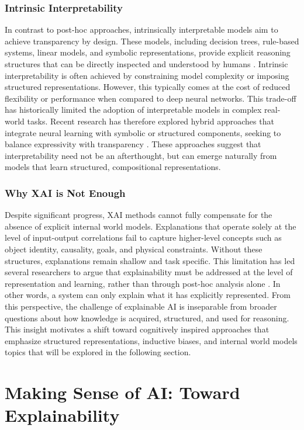 \documentclass[12pt,a4paper]{report}
\begin{document}
\subsubsection{Intrinsic Interpretability}
In contrast to post-hoc approaches, intrinsically interpretable models aim to achieve transparency by design. These models, including decision trees, rule-based systems, linear models, and symbolic representations, provide explicit reasoning structures that can be directly inspected and understood by humans \cite{chiave25}.
Intrinsic interpretability is often achieved by constraining model complexity or imposing structured representations. However, this typically comes at the cost of reduced flexibility or performance when compared to deep neural networks. This trade-off has historically limited the adoption of interpretable models in complex real-world tasks.
Recent research has therefore explored hybrid approaches that integrate neural learning with symbolic or structured components, seeking to balance expressivity with transparency \cite{chiave26}. These approaches suggest that interpretability need not be an afterthought, but can emerge naturally from models that learn structured, compositional representations.

\subsubsection{Why XAI is Not Enough}
Despite significant progress, XAI methods cannot fully compensate for the absence of explicit internal world models. Explanations that operate solely at the level of input-output correlations fail to capture higher-level concepts such as object identity, causality, goals, and physical constraints. Without these structures, explanations remain shallow and task specific.
This limitation has led several researchers to argue that explainability must be addressed at the level of representation and learning, rather than through post-hoc analysis alone \cite{chiave27}. In other words, a system can only explain what it has explicitly represented.
From this perspective, the challenge of explainable AI is inseparable from broader questions about how knowledge is acquired, structured, and used for reasoning. This insight motivates a shift toward cognitively inspired approaches that emphasize structured representations, inductive biases, and internal world models topics that will be explored in the following section.

\section{Making Sense of AI: Toward Explainability}
\end{document}
